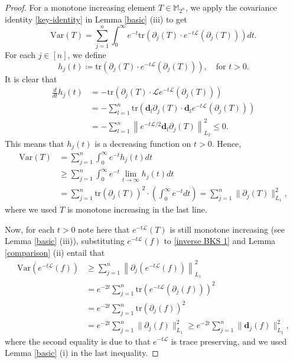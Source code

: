 \documentclass{amsbook}
\theoremstyle{definition}
\theoremstyle{remark}
\numberwithin{section}{chapter}
\numberwithin{equation}{chapter}
\newcommand{\M}{\mathbb{M}}
\newcommand{\1}{\mathbf{1}}
\newcommand{\dc}{\mathbf{d}}
\begin{document}
\begin{proof}
	For a monotone increasing element $T\in \M_{2^{n}}$, we apply the covariance identity \eqref{key-identity} in Lemma \ref{basic} (iii) to get
	\[
	\mathrm{Var}(T)=\sum_{j=1}^{n}\int_{0}^{\infty}e^{-t}\mathrm{tr}\left(\partial_{j}(T)\cdot e^{-t\mathcal{L}}\left(\partial_{j}(T)\right)\right)dt.
	\]
	For each $j\in [n]$, we define
	\[
	h_{j}(t)\coloneqq \mathrm{tr}\left(\partial_{j}(T)\cdot e^{-t\mathcal{L}}\left(\partial_{j}(T)\right)\right),\quad\mbox{for } t>0.
	\]
	It is clear that
	\begin{align*}
		\frac{d}{dt}h_{j}(t)&=-\mathrm{tr}\left(\partial_{j}(T)\cdot \mathcal{L} e^{-t\mathcal{L}}\left(\partial_{j}(T)\right)\right)\\
		&=-\sum_{l=1}^{n}\mathrm{tr}\left(\dc_{l}\partial_{j}(T)\cdot \dc_{l}e^{-t\mathcal{L}}\left(\partial_{j}(T)\right)\right)\\
		&=-\sum_{l=1}^{n}\left\|e^{-t\mathcal{L}/2}\dc_{l}\partial_{j}(T)\right\|^{2}_{L_{2}}\leq 0.
	\end{align*}
	This means that $h_{j}(t)$ is a decreasing function on $t>0$. Hence,
	\begin{equation}\label{inverse BKS 1}
		\begin{split}
			\mathrm{Var}(T)&=\sum_{j=1}^{n}\int_{0}^{\infty}e^{-t}h_{j}(t)dt\\
			&\geq\sum_{j=1}^{n}\int_{0}^{\infty}e^{-t}\lim_{t\to \infty}h_{j}(t)dt\\
			&=\sum_{j=1}^{n}\mathrm{tr}\left(\partial_{j}(T)\right)^{2}\cdot\left(\int_{0}^{\infty}e^{-t}dt\right)=\sum_{j=1}^{n}\|\partial_{j}(T)\|^{2}_{L_{1}},
		\end{split}
	\end{equation}
	where we used $T$ is monotone increasing in the last line.
	
	Now, for each $t>0$ note here that $e^{-t\mathcal{L}}(T)$ is still monotone increasing (see Lemma \ref{basic} (iii)),   substituting $e^{-t\mathcal{L}}(f)$ to \eqref{inverse BKS 1} and Lemma \ref{comparison} (ii) entail that
	\begin{align*}
		\mathrm{Var}\left(e^{-t\mathcal{L}}(f)\right)&\geq\sum_{j=1}^{n}\left\|\partial_{j}\left(e^{-t\mathcal{L}}(f)\right)\right\|^{2}_{L_{1}}\\
		&=e^{-2t}\sum_{j=1}^{n}\mathrm{tr}\left(e^{-t\mathcal{L}}\left(\partial_{j}(f)\right)\right)^{2}\\
		&=e^{-2t}\sum_{j=1}^{n}\mathrm{tr}\left( \partial_{j}(f)\right)^{2}\\
		&=e^{-2t}\sum_{j=1}^{n}\|\partial_{j}(f)\|^{2}_{L_{1}}\geq e^{-2t}\sum_{j=1}^{n}\|\dc_{j}(f)\|^{2}_{L_{1}},
	\end{align*}
	where the second equality is due to that $e^{-t\mathcal{L}}$ is trace preserving, and we used Lemma \ref{basic} (i) in the last inequality.
\end{proof}
\end{document}
